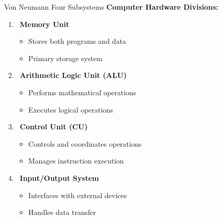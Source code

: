 \documentclass[aspectratio=169]{beamer}
\begin{document}
\begin{frame}{Von Neumann Four Subsystems}
    \textbf{Computer Hardware Divisions:}
    
    \begin{enumerate}
        \item \faMemory\, \textbf{Memory Unit}
        \begin{itemize}
            \item Stores both programs and data
            \item Primary storage system
        \end{itemize}
        
        \item \faCalculator\, \textbf{Arithmetic Logic Unit (ALU)}
        \begin{itemize}
            \item Performs mathematical operations
            \item Executes logical operations
        \end{itemize}
        
        \item \faCogs\, \textbf{Control Unit (CU)}
        \begin{itemize}
            \item Controls and coordinates operations
            \item Manages instruction execution
        \end{itemize}
        
        \item \faExchangeAlt\, \textbf{Input/Output System}
        \begin{itemize}
            \item Interfaces with external devices
            \item Handles data transfer
        \end{itemize}
    \end{enumerate}
\end{frame}
\end{document}
